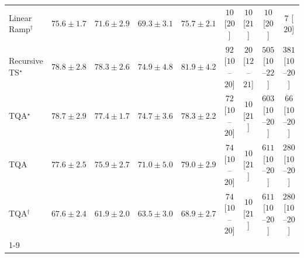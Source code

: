 \begin{tabular}{l|cccc|cccc|}
Linear Ramp$^\dagger$ & {\cellcolor[HTML]{1077B4}} \color[HTML]{F1F1F1} $75.6\pm 1.7$ & {\cellcolor[HTML]{5C9FC9}} \color[HTML]{F1F1F1} $71.6\pm 2.9$ & {\cellcolor[HTML]{89B1D4}} \color[HTML]{000000} $69.3\pm 3.1$ & {\cellcolor[HTML]{0F76B3}} \color[HTML]{F1F1F1} $75.7\pm 2.1$ & {\cellcolor[HTML]{FFF7F3}} \color[HTML]{000000} $10$ [$20$] & {\cellcolor[HTML]{FFF7F3}} \color[HTML]{000000} $10$ [$21$] & {\cellcolor[HTML]{FFF7F3}} \color[HTML]{000000} $10$ [$20$] & {\cellcolor[HTML]{FFF7F3}} \color[HTML]{000000} $7$ [$20$] \\
Recursive TS$^\star$ & {\cellcolor[HTML]{045C90}} \color[HTML]{F1F1F1} $78.8\pm 2.8$ & {\cellcolor[HTML]{046097}} \color[HTML]{F1F1F1} $78.3\pm 2.6$ & {\cellcolor[HTML]{1C7FB8}} \color[HTML]{F1F1F1} $74.9\pm 4.8$ & {\cellcolor[HTML]{02395A}} \color[HTML]{F1F1F1} $81.9\pm 4.2$ & {\cellcolor[HTML]{FDE4E1}} \color[HTML]{000000} $92$ [$10$--$20$] & {\cellcolor[HTML]{FFF4F0}} \color[HTML]{000000} $20$ [$12$--$21$] & {\cellcolor[HTML]{E13B98}} \color[HTML]{F1F1F1} $505$ [$10$--$22$] & {\cellcolor[HTML]{F87CA8}} \color[HTML]{F1F1F1} $381$ [$10$--$20$] \\
TQA$^\star$ & {\cellcolor[HTML]{045D92}} \color[HTML]{F1F1F1} $78.7\pm 2.9$ & {\cellcolor[HTML]{0567A2}} \color[HTML]{F1F1F1} $77.4\pm 1.7$ & {\cellcolor[HTML]{2081B9}} \color[HTML]{F1F1F1} $74.7\pm 3.6$ & {\cellcolor[HTML]{046097}} \color[HTML]{F1F1F1} $78.3\pm 2.2$ & {\cellcolor[HTML]{FEE9E5}} \color[HTML]{000000} $72$ [$10$--$20$] & {\cellcolor[HTML]{FFF7F3}} \color[HTML]{000000} $10$ [$21$] & {\cellcolor[HTML]{B70B83}} \color[HTML]{F1F1F1} $603$ [$10$--$20$] & {\cellcolor[HTML]{FEEAE7}} \color[HTML]{000000} $66$ [$10$--$20$] \\
TQA & {\cellcolor[HTML]{05659F}} \color[HTML]{F1F1F1} $77.6\pm 2.5$ & {\cellcolor[HTML]{0A73B2}} \color[HTML]{F1F1F1} $75.9\pm 2.7$ & {\cellcolor[HTML]{69A5CC}} \color[HTML]{F1F1F1} $71.0\pm 5.0$ & {\cellcolor[HTML]{045B8E}} \color[HTML]{F1F1F1} $79.0\pm 2.9$ & {\cellcolor[HTML]{FEE9E5}} \color[HTML]{000000} $74$ [$10$--$20$] & {\cellcolor[HTML]{FFF7F3}} \color[HTML]{000000} $10$ [$21$] & {\cellcolor[HTML]{B30681}} \color[HTML]{F1F1F1} $611$ [$10$--$20$] & {\cellcolor[HTML]{FBACB9}} \color[HTML]{000000} $280$ [$10$--$20$] \\
TQA$^\dagger$ & {\cellcolor[HTML]{A7BDDB}} \color[HTML]{000000} $67.6\pm 2.4$ & {\cellcolor[HTML]{ECE7F2}} \color[HTML]{000000} $61.9\pm 2.0$ & {\cellcolor[HTML]{DCDAEB}} \color[HTML]{000000} $63.5\pm 3.0$ & {\cellcolor[HTML]{8FB4D6}} \color[HTML]{000000} $68.9\pm 2.7$ & {\cellcolor[HTML]{FEE9E5}} \color[HTML]{000000} $74$ [$10$--$20$] & {\cellcolor[HTML]{FFF7F3}} \color[HTML]{000000} $10$ [$21$] & {\cellcolor[HTML]{B30681}} \color[HTML]{F1F1F1} $611$ [$10$--$20$] & {\cellcolor[HTML]{FBACB9}} \color[HTML]{000000} $280$ [$10$--$20$] \\
\cline{1-9}
\bottomrule
\end{tabular}
